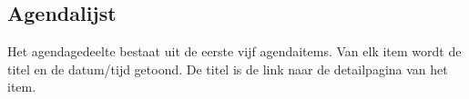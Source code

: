 \subsection{Agendalijst}
\label{sec:agendalijst}
Het agendagedeelte  bestaat uit de eerste vijf agendaitems. Van elk item wordt de titel en de datum/tijd getoond. De titel is de link naar de detailpagina van het item.